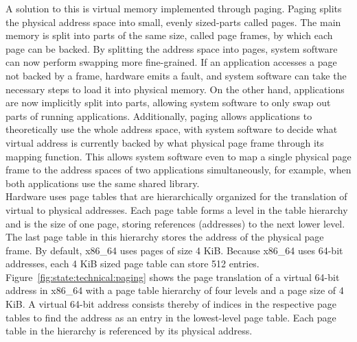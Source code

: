 A solution to this is virtual memory implemented through
paging.\cite{tanenbaum2015modern} Paging splits the physical address space into
small, evenly sized-parts called pages. The main memory is split into parts of
the same size, called page frames, by which each page can be backed. By
splitting the address space into pages, system software can now perform swapping
more fine-grained. If an application accesses a page not backed by a frame,
hardware emits a fault, and system software can take the necessary steps to load
it into physical memory. On the other hand, applications are now implicitly
split into parts, allowing system software to only swap out parts of running
applications. Additionally, paging allows applications to theoretically use the
whole address space, with system software to decide what virtual address is
currently backed by what physical page frame through its mapping function. This
allows system software even to map a single physical page frame to the address
spaces of two applications simultaneously, for example, when both applications
use the same shared library.\\

Hardware uses page tables that are hierarchically organized for the translation
of virtual to physical addresses. Each page table forms a level in the table
hierarchy and is the size of one page, storing references (addresses) to the
next lower level. The last page table in this hierarchy stores the address of
the physical page frame. By default, x86\_64 uses pages of size 4 KiB. Because
x86\_64 uses 64-bit addresses, each 4 KiB sized page table can store 512
entries. Figure~\ref{fig:state:technical:paging} shows the page translation of a
virtual 64-bit address in x86\_64 with a page table hierarchy of four levels and
a page size of 4 KiB. A virtual 64-bit address consists thereby of indices in
the respective page tables to find the address as an entry in the lowest-level
page table. Each page table in the hierarchy is referenced by its physical
address.\\

